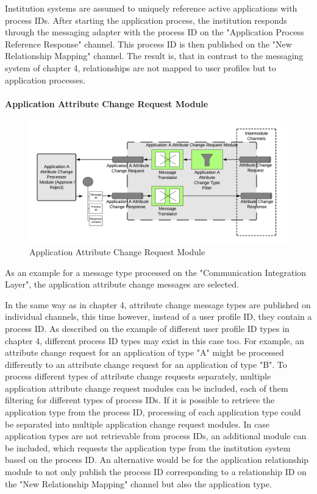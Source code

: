 Institution systems are assumed to uniquely reference active applications with process IDs. After starting the application process, the institution responds through the messaging adapter with the process ID on the "Application Process Reference Response" channel. This process ID is then published on the "New Relationship Mapping" channel. The result is, that in contrast to the messaging system of chapter 4, relationships are not mapped to user profiles but to application processes.

\paragraph{Application Attribute Change Request Module}

\begin{figure}[H]
    \centering
    \includegraphics[scale=0.6]{Diagrams/Integration Architecture 2/Technological Integration/7. Application Attribute Change Request Module.pdf}
    \caption{Application Attribute Change Request Module}
    \label{integration2:application_attribute_change_request_module}
\end{figure}

As an example for a message type processed on the "Communication Integration Layer", the application attribute change messages are selected.

In the same way as in chapter 4, attribute change message types are published on individual channels, this time however, instead of a user profile ID, they contain a process ID. As described on the example of different user profile ID types in chapter 4, different process ID types may exist in this case too. For example, an attribute change request for an application of type "A" might be processed differently to an attribute change request for an application of type "B". To process different types of attribute change requests separately, multiple application attribute change request modules can be included, each of them filtering for different types of process IDs. If it is possible to retrieve the application type from the process ID, processing of each application type could be separated into multiple application change request modules. In case application types are not retrievable from process IDs, an additional module can be included, which requests the application type from the institution system based on the process ID. An alternative would be for the application relationship module to not only publish the process ID corresponding to a relationship ID on the "New Relationship Mapping" channel but also the application type.

